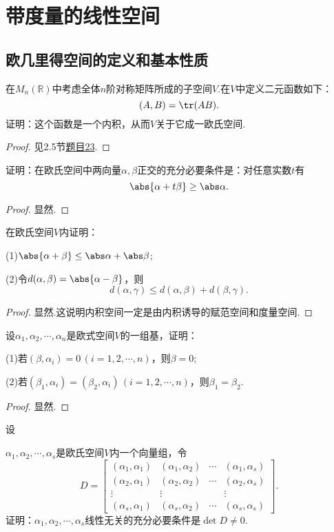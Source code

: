 \section{带度量的线性空间}
\subsection{欧几里得空间的定义和基本性质}
\begin{prob}[2]
	在$M_n(\mathbb{R})$中考虑全体$n$阶对称矩阵所成的子空间$V$.在$V$中定义二元函数如下：
	\[
		(A,B)=\tr(AB).
	\]
	证明：这个函数是一个内积，从而$V$关于它成一欧氏空间.
\end{prob}
\begin{proof}
	见2.5节\hyperlink{TraceProperty}{题目23}.
\end{proof}
\begin{prob}[4]
	证明：在欧氏空间中两向量$\alpha,\beta$正交的充分必要条件是：对任意实数$t$有
	\[
		\abs{\alpha+t\beta}\ge\abs\alpha.
	\]
\end{prob}
\begin{proof}
	显然.
\end{proof}
\begin{prob}[5]
	在欧氏空间$V$内证明：

	(1)$\abs{\alpha+\beta}\le\abs\alpha+\abs\beta$;

	(2)令$d(\alpha,\beta)=\abs{\alpha-\beta}$，则
	\[
		d(\alpha,\gamma)\le d(\alpha,\beta)+d(\beta,\gamma).
	\]
\end{prob}
\begin{proof}
	显然.这说明内积空间一定是由内积诱导的赋范空间和度量空间.
\end{proof}
\begin{prob}[7]
	设$\alpha_1,\alpha_2,\cdots,\alpha_n$是欧式空间$V$的一组基，证明：

	(1)若$(\beta,\alpha_i)=0\,(i=1,2,\cdots,n)$，则$\beta=0$;

	(2)若$(\beta_1,\alpha_i)=(\beta_2,\alpha_i)\,(i=1,2,\cdots,n)$，则$\beta_1=\beta_2$.
\end{prob}
\begin{proof}
	显然.
\end{proof}
\begin{prob}[15]
	\hypertarget{GramMatrix}{设}$\alpha_1,\alpha_2,\cdots,\alpha_s$是欧氏空间$V$内一个向量组，令
	\[
		D=\begin{bmatrix}
			(\alpha_1,\alpha_1) & (\alpha_1,\alpha_2) & \cdots & (\alpha_1,\alpha_s) \\
			(\alpha_2,\alpha_1) & (\alpha_2,\alpha_2) & \cdots & (\alpha_2,\alpha_s) \\
			\vdots              & \vdots              &        & \vdots              \\
			(\alpha_s,\alpha_1) & (\alpha_s,\alpha_2) & \cdots & (\alpha_s,\alpha_s)
		\end{bmatrix}.
	\]
	证明：$\alpha_1,\alpha_2,\cdots,\alpha_s$线性无关的充分必要条件是$\det D\ne0$.
\end{prob}
